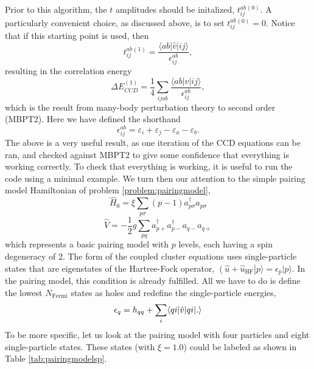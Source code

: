   Prior to this algorithm, the $t$ amplitudes should be initalized,
  $t_{ij}^{ab}{}^{(0)}$. A particularly convenient choice, as discussed above, is to set
  $t_{ij}^{ab}{}^{(0)} = 0$. Notice that if this starting point is
  used, then
  \begin{equation}
  t_{ij}^{ab}{}^{(1)} = \frac{\langle ab \vert \hat{v} \vert ij\rangle}{\epsilon^{ab}_{ij}},
  \label{eq:ccdGuess}
  \end{equation}
resulting in the correlation energy
  \begin{equation}
  \Delta E_{CCD}^{(1)} = \frac{1}{4} \sum_{ijab}\frac{\langle ab \vert
    \hat{v} \vert ij \rangle}{\epsilon^{ab}_{ij}},
  \end{equation}
  which is the result from many-body perturbation theory to second order (MBPT2). Here we have defined the shorthand
\[
\epsilon^{ab}_{ij}=\varepsilon_i+\varepsilon_j-\varepsilon_a-\varepsilon_b.
\]
The above is a very useful result, as one iteration
  of the CCD equations can be ran, and checked against MBPT2 to give
  some confidence that everything is working correctly. To check that
  everything is working, it is useful to run the code using a minimal
  example. We turn then our attention to the simple pairing model Hamiltonian of problem \ref{problem:pairingmodel},
  \begin{equation}
  \hat{H}_0 = \xi \sum_{p \sigma} (p-1) a^{\dagger}_{p \sigma} a_{p
    \sigma}
  \end{equation}
  \begin{equation}
  \hat{V} = -\frac{1}{2}g \sum_{pq} a^{\dagger}_{p+}a^{\dagger}_{p-}
  a_{q-}a_{q+}
  \end{equation}
  which represents a basic pairing model with $p$ levels, each having a
  spin degeneracy of 2. The form of the coupled cluster equations 
  uses single-particle states that are eigenstates of the
  Hartree-Fock operator, $\left(\hat{u}+\hat{u}_{\text{HF}}\right\vert
  p\rangle=\epsilon_{p}\vert p\rangle$. In the pairing model, this
  condition is already fulfilled. All we have to do is define the
  lowest $N_{\mathrm{Fermi}}$ states as holes and  redefine the single-particle
  energies,
  \begin{equation}\label{eq:pairingsp}
  \epsilon_q = h_{qq} + \sum_{i} \braket{qi|\hat{v}|qi}.
  \end{equation}
  To be more specific, let us look at the pairing model with four
  particles and eight single-particle states. These states (with $\xi =1.0$) could be labeled as shown in 
Table \ref{tab:pairingmodelsp}.
